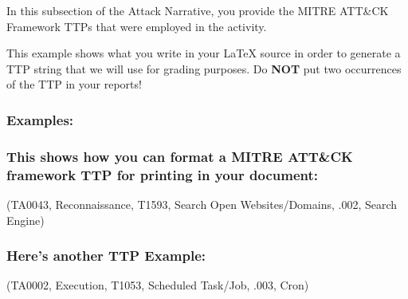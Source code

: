\documentclass[notitlepage]{article}
\begin{document}
    In this subsection of the Attack Narrative, you provide the
    MITRE ATT{\&}CK Framework TTPs that were employed in the
    activity.
    
    This example shows what you write in your LaTeX source
    in order to generate a TTP string that we will use for
    grading purposes. Do \textbf{NOT} put two occurrences of
    the TTP in your reports!
    
    \subsubsection*{Examples:}
    
	
	\subsubsection*{This shows how you can format a MITRE ATT{\&}CK framework TTP for printing in your document:}
	\ttp(TA0043, Reconnaissance, T1593, Search Open Websites/Domains, .002, Search Engine)
    
	\subsubsection*{Here's another TTP Example:}
	\ttp(TA0002, Execution, T1053, Scheduled Task/Job, .003, Cron) 
\end{document}

